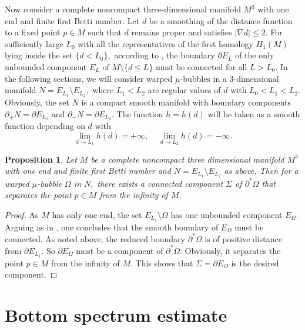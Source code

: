\documentclass[10pt,a4paper]{amsart}
\newtheorem{proposition}[theorem]{Proposition}
\numberwithin{equation}{section}
\begin{document}
Now consider a complete noncompact three-dimensional manifold $M^{3}$ with one end and finite first Betti number. 
Let $d$ be a smoothing of the distance function to a fixed point $p\in M$ such that $d$ remains proper and satisfies 
$\left\vert \nabla d\right\vert \leq 2.$ 
For sufficiently large $L_0$ with all the representatives of the first homology $H_1(M)$ lying inside the set $\{d<L_0\},$
according to \cite{LT}, the boundary $\partial E_L$ of the only unbounded component $E_L$ of $M\setminus \{d\leq L\}$  
must be connected for all $L>L_0.$ 
In the following sections, we will consider warped $\mu$-bubbles in a $3$-dimensional manifold $N=E_{L_1}\setminus E_{L_2},$
where $L_1<L_2$ are regular values of $d$ with $L_0<L_1<L_2.$ Obviously,  
the set $N$ is a compact smooth manifold with boundary
components $\partial _{+}N=\partial E_{L_1}$ and $\partial _{-}N=\partial E_{L_2}.$
The function $h=h\left( d\right) $ will be taken as a smooth function depending on $d$ with
\begin{equation}
\lim_{d\rightarrow L_1}h\left( d\right) =+\infty ,\ \ \ \ \
\lim_{d\rightarrow L_2}h\left( d\right) =-\infty.  \label{a1}
\end{equation}

\begin{proposition}\label{X}
Let $M$ be a complete noncompact three dimensional manifold $M^{3}$ with one end and finite first Betti number
and $N=E_{L_1}\setminus E_{L_2}$ as above. Then for a warped $\mu$-bubble $\Omega$ in $N,$ there exists  
a connected component $\Sigma$ of $\partial ^{\ast }\Omega $ that separates the point
$p\in M$ from the infinity of $M.$ 
\end{proposition}

\begin{proof}
As $M$ has only one end, the set $E_{L_1}\setminus \Omega$ has one unbounded component $E_{\Omega}.$ 
Arguing as in \cite{LT}, one concludes that the smooth boundary of $E_{\Omega}$ must be connected. 
As noted above, the reduced boundary $\partial ^{\ast }\Omega $ is of positive distance from $\partial E_{L_1}.$
So $\partial E_{\Omega}$ must be a component of $\partial ^{\ast }\Omega.$ Obviously, it separates the point
$p\in M$ from the infinity of $M.$ 
This shows that $\Sigma=\partial E_{\Omega}$
is the desired component.
\end{proof}

\section{Bottom spectrum estimate}
\end{document}
